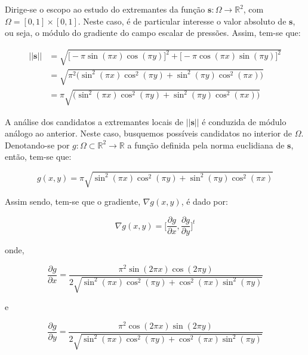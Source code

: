 Dirige-se o escopo ao estudo do extremantes da função $ \mathbf{s}:\Omega \rightarrow \mathbb{R}^{2} $, com $ \Omega = [0,1] \times [0,1] $. Neste caso, é de particular interesse o valor absoluto de $ \mathbf{s} $, ou seja, o módulo do gradiente do campo escalar de pressões. Assim, tem-se que:

\begin{equation}
	\begin{aligned}
		||\mathbf{s}|| &= \sqrt{\big[-\pi \sin(\pi x) \cos(\pi y)\big]^{2} + \big[-\pi \cos(\pi x) \sin(\pi y)\big]^{2}} \\
		&= \sqrt{\pi^{2} \big( \sin^{2}(\pi x)\cos^{2}(\pi y) + \sin^{2}(\pi y) \cos^{2}(\pi x)\big)} \\
		&= \pi \sqrt{\big( \sin^{2}(\pi x)\cos^{2}(\pi y) + \sin^{2}(\pi y) \cos^{2}(\pi x)\big)}
	\end{aligned}   
\end{equation}

A análise dos candidatos a extremantes locais de $ ||\mathbf{s}|| $ é conduzida de módulo análogo ao anterior. Neste caso, busquemos possíveis candidatos no interior de $ \Omega $. Denotando-se por $ g: \Omega \subset \mathbb{R}^{2} \rightarrow \mathbb{R} $ a função definida pela norma euclidiana de $ \mathbf{s} $, então, tem-se que:

\begin{equation}
	g(x, y) = \pi \sqrt{\sin^2(\pi x) \cos^2(\pi y) + \sin^2(\pi y) \cos^2(\pi x)}
\end{equation}

Assim sendo, tem-se que o gradiente, $ \nabla g(x, y) $, é dado por:

\begin{equation}
	\nabla g(x, y) = \bigg[ \frac{\partial g}{\partial x}, \frac{\partial g}{\partial y} \bigg]^{t}
\end{equation}

onde,

\begin{equation}
	\frac{\partial g}{\partial x} = \frac{\pi^2 \sin(2\pi x) \cos(2\pi y)}{2\sqrt{\sin^2(\pi x) \cos^2(\pi y) + \cos^2(\pi x) \sin^2(\pi y)}}
\end{equation}

e

\begin{equation}
	\frac{\partial g}{\partial y} =\frac{\pi^2 \cos(2\pi x) \sin(2\pi y)}{2\sqrt{\sin^2(\pi x) \cos^2(\pi y) + \cos^2(\pi x) \sin^2(\pi y)}}
\end{equation}

